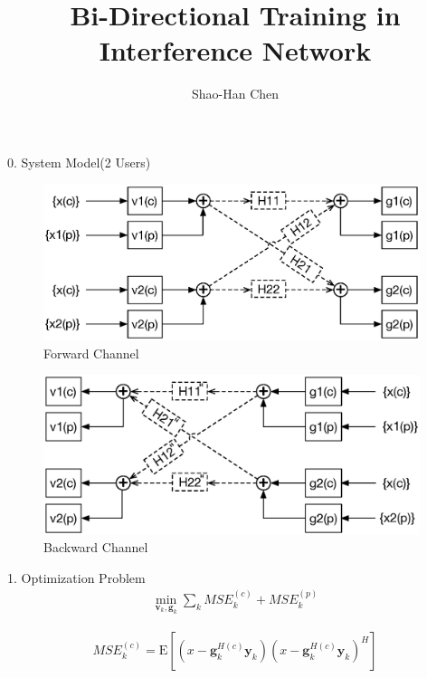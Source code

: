 \documentclass[11pt, oneside]{article}   	%
\title{Bi-Directional Training in Interference Network}
\author{Shao-Han Chen}
\begin{document}
\maketitle

0. System Model(2 Users)

\begin{figure}[h]
    \centering
    \centerline{\includegraphics[width=110mm]{forward_channel}}
    \caption{Forward Channel}
\end{figure} 

\begin{figure}[h]
    \centering
    \centerline{\includegraphics[width=110mm]{backward_channel}}
    \caption{Backward Channel}
\end{figure} 

\newpage


1. Optimization Problem
\begin{align*}
\min_{\textbf{v}_{k} ,\textbf{g}_{k}} \displaystyle\sum_{k} MSE^{(c)}_{k}+MSE^{(p)}_{k}
\end{align*}

\begin{align*}
MSE^{(c)}_{k} = \mathrm{E}	[	(	x-\textbf{g}^{H(c)}_{k}	\textbf{y}_{k}	)(x-\textbf{g}^{H(c)}_{k}	\textbf{y}_{k})^{H}	]
\end{align*}
\end{document}
